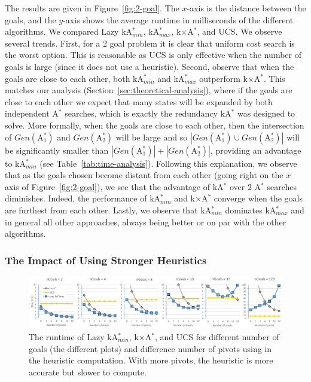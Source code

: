 \documentclass{aicom2e}
\newcommand{\astar}{A$^*$}
\newcommand{\kastar}{kA$^*$}
\newcommand{\kastarmin}{kA$^*_{min}$}
\newcommand{\kastarmax}{kA$^*_{max}$}
\newcommand{\kxastar}{k$\times$A$^*$}
\newcommand{\astari}[1]{A$^*_#1$}
\begin{document}
The results are given in Figure~\ref{fig:2-goal}. The $x$-axis is the distance
between the goals, and the $y$-axis shows the average runtime in milliseconds
of the different algorithms. We compared Lazy \kastarmin{}, \kastarmax{},
\kxastar{}, and UCS. We observe several trends. First, for a 2 goal problem it
is clear that uniform cost search is the worst option. This is reasonable as
UCS is only effective when the number of goals is large (since it does not use
a heuristic).
Second, observe that when the goals are close to each other, both \kastarmin{}
and \kastarmax{} outperform \kxastar{}. This matches our analysis
(Section~\ref{sec:theoretical-analysis}), where if the goals are close to each
other we expect that many states will be expanded by both independent \astar{}
searches, which is  exactly the redundancy \kastar{} was designed to solve.
More formally, when the goals are close to each other, then the intersection of
$Gen(\text{\astari{1}})$ and $Gen(\text{\astari{2}})$ will be large and so
$|Gen(\text{\astari{1}})\cup Gen(\text{\astari{2}})|$ will be significantly
smaller than $|Gen(\text{\astari{1}})|+|Gen(\text{\astari{2}})|$, providing an
advantage to \kastarmin{} (see Table~\ref{tab:time-analysis}). Following this
explanation, we observe that as the goals chosen become distant from each other
(going right on the $x$ axis of Figure~\ref{fig:2-goal}), we see that the
advantage of \kastar{} over 2 \astar{} searches diminishes. Indeed, the
performance of \kastarmin{}  and \kxastar{} converge when the goals are
furthest from each other. Lastly, we observe that \kastarmin{} dominates
\kastarmax{} and in general all other approaches, always being better or on par
with the other algorithms.

\subsubsection{The Impact of Using Stronger Heuristics}

\begin{figure}
    \includegraphics[width=\textwidth]{heuristic-power_cropped.pdf}
\caption{The runtime of Lazy \kastarmin{}, \kxastar{}, and UCS for different
number of goals (the different plots) and difference number of pivots using in
the heuristic computation. With more pivots, the heuristic is more accurate but
slower to compute.}
    \label{fig:dh-results}
\end{figure}
\end{document}
